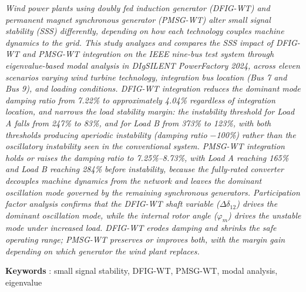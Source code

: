 {\itshape
Wind power plants using doubly fed induction generator (DFIG-WT) and permanent
magnet synchronous generator (PMSG-WT) alter small signal stability (SSS)
differently, depending on how each technology couples machine dynamics to the
grid. This study analyzes and compares the SSS impact of DFIG-WT and PMSG-WT
integration on the IEEE nine-bus test system through eigenvalue-based modal
analysis in DIgSILENT PowerFactory 2024, across eleven scenarios varying wind
turbine technology, integration bus location (Bus 7 and Bus 9), and loading
conditions. DFIG-WT integration reduces the dominant mode damping ratio from
7.22\% to approximately 4.04\% regardless of integration location, and narrows
the load stability margin: the instability threshold for Load A falls from 247\%
to 83\%, and for Load B from 373\% to 123\%, with both thresholds producing
aperiodic instability (damping ratio $-$100\%) rather than the oscillatory
instability seen in the conventional system. PMSG-WT integration holds or raises
the damping ratio to 7.25\%--8.73\%, with Load A reaching 165\% and Load B
reaching 284\% before instability, because the fully-rated converter decouples
machine dynamics from the network and leaves the dominant oscillation mode
governed by the remaining synchronous generators. Participation factor analysis
confirms that the DFIG-WT shaft variable ($\Delta\delta_{12}$) drives the
dominant oscillation mode, while the internal rotor angle ($\varphi_m$) drives
the unstable mode under increased load. DFIG-WT erodes damping and shrinks the
safe operating range; PMSG-WT preserves or improves both, with the margin gain
depending on which generator the wind plant replaces.
}

\noindent\textbf{Keywords} : small signal stability, DFIG-WT, PMSG-WT, modal analysis, eigenvalue

